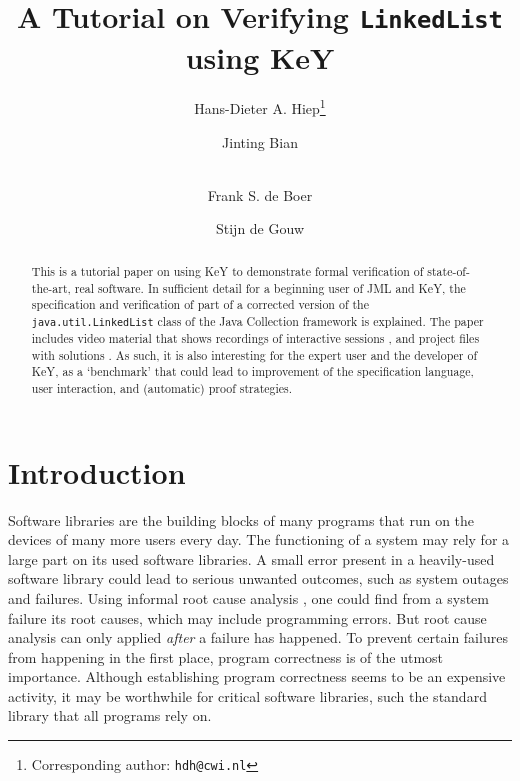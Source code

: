 \documentclass[runningheads]{llncs}
\begin{document}
\renewcommand{\thelstlisting}{\arabic{lstlisting}}

\title{A Tutorial on Verifying \texttt{LinkedList} using KeY}
\author{{Hans-Dieter} A. Hiep\footnote{Corresponding author: \texttt{hdh@cwi.nl}} \and Jinting Bian \and\\
Frank S. de Boer \and Stijn de Gouw}


\maketitle

\begin{abstract}
This is a tutorial paper on using KeY to demonstrate formal verification of state-of-the-art, real software. In sufficient detail for a beginning user of JML and KeY, the specification and verification of part of a corrected version of the \texttt{java.util.LinkedList} class of the Java Collection framework is explained. The paper includes video material that shows recordings of interactive sessions , and project files with solutions . As such, it is also interesting for the expert user and the developer of KeY, as a `benchmark' that could lead to improvement of the specification language, user interaction, and (automatic) proof strategies.
\end{abstract}


\section{Introduction}

Software libraries are the building blocks of many programs that run on the devices of many more users every day. The functioning of a system may rely for a large part on its used software libraries. A small error present in a heavily-used software library could lead to serious unwanted outcomes, such as system outages and failures. Using informal root cause analysis \cite{rooney2004root}, one could find from a system failure its root causes, which may include programming errors. But root cause analysis can only applied \emph{after} a failure has happened. To prevent certain failures from happening in the first place, program correctness is of the utmost importance. Although establishing program correctness seems to be an expensive activity, it may be worthwhile for critical software libraries, such the standard library that all programs rely on.
\end{document}
